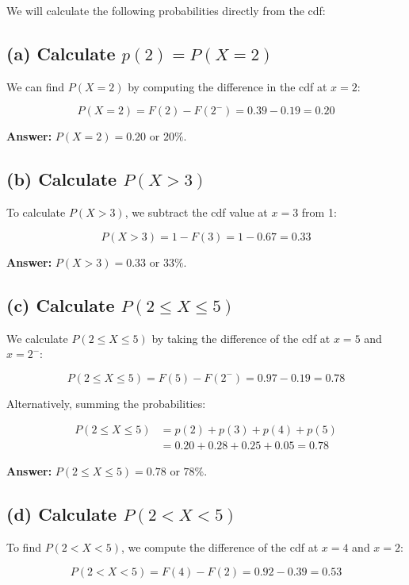 \documentclass{article}
\begin{document}
We will calculate the following probabilities directly from the cdf:

\subsection*{(a) Calculate \( p(2) = P(X = 2) \)}

We can find \( P(X = 2) \) by computing the difference in the cdf at \( x = 2 \):

\[
P(X = 2) = F(2) - F(2^-) = 0.39 - 0.19 = 0.20
\]

\textbf{Answer:} \( P(X = 2) = 0.20 \) or \( 20\% \).

\subsection*{(b) Calculate \( P(X > 3) \)}

To calculate \( P(X > 3) \), we subtract the cdf value at \( x = 3 \) from 1:

\[
P(X > 3) = 1 - F(3) = 1 - 0.67 = 0.33
\]

\textbf{Answer:} \( P(X > 3) = 0.33 \) or \( 33\% \).

\subsection*{(c) Calculate \( P(2 \leq X \leq 5) \)}

We calculate \( P(2 \leq X \leq 5) \) by taking the difference of the cdf at \( x = 5 \) and \( x = 2^- \):

\[
P(2 \leq X \leq 5) = F(5) - F(2^-) = 0.97 - 0.19 = 0.78
\]

Alternatively, summing the probabilities:

\[
\begin{aligned}
P(2 \leq X \leq 5) &= p(2) + p(3) + p(4) + p(5) \\
&= 0.20 + 0.28 + 0.25 + 0.05 = 0.78
\end{aligned}
\]

\textbf{Answer:} \( P(2 \leq X \leq 5) = 0.78 \) or \( 78\% \).

\subsection*{(d) Calculate \( P(2 < X < 5) \)}

To find \( P(2 < X < 5) \), we compute the difference of the cdf at \( x = 4 \) and \( x = 2 \):

\[
P(2 < X < 5) = F(4) - F(2) = 0.92 - 0.39 = 0.53
\]
\end{document}
